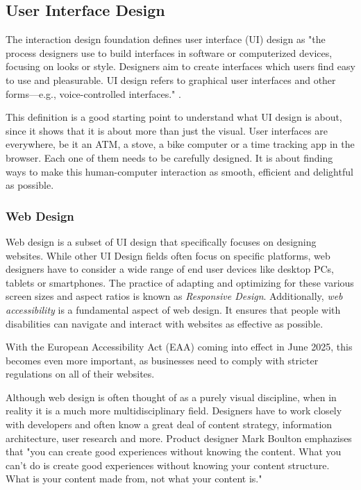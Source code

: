 \newpage
\subsection{User Interface Design}
The interaction design foundation defines user interface (UI) design as "the process designers use
to build interfaces in software or computerized devices, focusing on looks or style. Designers aim
to create interfaces which users find easy to use and pleasurable. UI design refers to graphical
user interfaces and other forms—e.g., voice-controlled interfaces."
.

This definition is a good starting point to understand what UI design is about, since it
shows that it is about more than just the visual. User interfaces are everywhere, be it an ATM, a
stove, a bike computer or a time tracking app in the browser. Each one of them needs to be
carefully designed. It is about finding ways to make this human-computer interaction as smooth,
efficient and delightful as possible.

\subsubsection{Web Design}
Web design is a subset of UI design that specifically focuses on designing websites. While other UI
Design fields often focus on specific platforms, web designers have to consider a wide range of end
user devices like desktop PCs, tablets or smartphones. The practice of adapting and optimizing for
these various screen sizes and aspect ratios is known as \textit{Responsive Design}. Additionally,
\textit{web accessibility} is a fundamental aspect of web design. It ensures that people with
disabilities can navigate and interact with websites as effective as possible.

With the European Accessibility Act (EAA) coming into effect in June 2025, this becomes even more
important, as businesses need to comply with stricter regulations on all of their websites.

Although web design is often thought of as a purely visual discipline, when in reality it is a much
more multidisciplinary field. Designers have to work closely with developers and often know a great
deal of content strategy, information architecture, user research and more. Product designer Mark
Boulton emphazises that "you can create good experiences without knowing the content. What you can't
do is create good experiences without knowing your content structure. What is your content made
from, not what your content is." 

